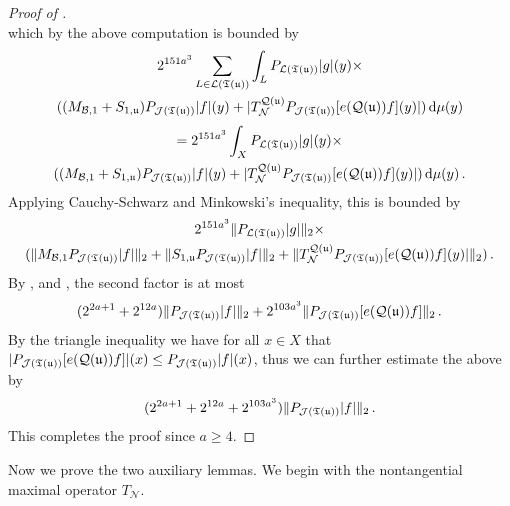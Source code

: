 \begin{proof}[Proof of ]
$$    $$
    which by the above computation is bounded by
    \begin{multline*}
        2^{151a^3} \sum_{L \in \mathcal{L}({\mathfrak T}({\mathfrak u}))} \int_L P_{\mathcal{L}({\mathfrak T}({\mathfrak u}))}|g|(y) \times \\((M_{\mathcal{B},1}+S_{1,{\mathfrak u}})P_{\mathcal{J}({\mathfrak T}({\mathfrak u}))}|f|(y)+|T_{\mathcal{N}}^{{\mathcal{Q}}({\mathfrak u})}P_{\mathcal{J}({\mathfrak T}({\mathfrak u}))}[e({\mathcal{Q}}({\mathfrak u}))f](y)| ) \, \mathrm{d}\mu(y)
    \end{multline*}
    \begin{multline*}
        = 2^{151a^3} \int_X P_{\mathcal{L}({\mathfrak T}({\mathfrak u}))}|g|(y)\times \\((M_{\mathcal{B},1}+S_{1,{\mathfrak u}})P_{\mathcal{J}({\mathfrak T}({\mathfrak u}))}|f|(y)+|T_{\mathcal{N}}^{{\mathcal{Q}}({\mathfrak u})}P_{\mathcal{J}({\mathfrak T}({\mathfrak u}))}[e({\mathcal{Q}}({\mathfrak u}))f](y)| ) \, \mathrm{d}\mu(y)\,.
    \end{multline*}
    Applying Cauchy-Schwarz and Minkowski's inequality, this is bounded by
    \begin{multline*}
        2^{151a^3} \|P_{\mathcal{L}({\mathfrak T}({\mathfrak u}))}|g|\|_2 \times \\(\|M_{\mathcal{B},1}P_{\mathcal{J}({\mathfrak T}({\mathfrak u}))}|f|\|_2 + \|S_{1,{\mathfrak u}}P_{\mathcal{J}({\mathfrak T}({\mathfrak u}))}|f|\|_2 + \|T_{\mathcal{N}}^{{\mathcal{Q}}({\mathfrak u})}P_{\mathcal{J}({\mathfrak T}({\mathfrak u}))}[e({\mathcal{Q}}({\mathfrak u}))f](y)|\|_2)\,.
    \end{multline*}
    By ,  and , the second factor is at most
    $$
        (2^{2a+1} + 2^{12a})\|P_{\mathcal{J}({\mathfrak T}({\mathfrak u}))}|f|\|_2 + 2^{103a^3} \|P_{\mathcal{J}({\mathfrak T}({\mathfrak u}))}[e({\mathcal{Q}}({\mathfrak u}))f]\|_2\,.
    $$
    By the triangle inequality we have for all $x \in X$ that $|P_{\mathcal{J}({\mathfrak T}({\mathfrak u}))}[e({\mathcal{Q}}({\mathfrak u}))f]|(x) \le P_{\mathcal{J}({\mathfrak T}({\mathfrak u}))}|f|(x)$, thus we can further estimate the above by
    $$
        (2^{2a+1} + 2^{12a} + 2^{103a^3}) \|P_{\mathcal{J}({\mathfrak T}({\mathfrak u}))}|f|\|_2\,.
    $$
    This completes the proof since $a \ge 4$.
\end{proof}

Now we prove the two auxiliary lemmas. We begin with the nontangential maximal operator $T_{\mathcal{N}}$.

